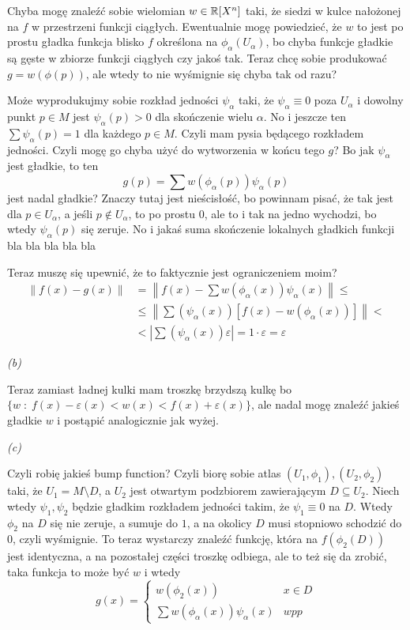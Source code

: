 \documentclass{article}
\begin{document}
Chyba mogę znaleźć sobie wielomian $w\in\mathbb{R}[X^n]$ taki, że siedzi w kulce nałożonej na $f$ w przestrzeni funkcji ciągłych. Ewentualnie mogę powiedzieć, że $w$ to jest po prostu gładka funkcja blisko $f$ określona na $\phi_\alpha(U_\alpha)$, bo chyba funkcje gładkie są gęste w zbiorze funkcji ciągłych czy jakoś tak. Teraz chcę sobie produkować $g=w(\phi(p))$, ale wtedy to nie wyśmignie się chyba tak od razu?

Może wyprodukujmy sobie rozkład jedności $\psi_\alpha$ taki, że $\psi_\alpha\equiv0$ poza $U_\alpha$ i dowolny punkt $p\in M$ jest $\psi_\alpha(p)>0$ dla skończenie wielu $\alpha$. No i jeszcze ten $\sum\psi_\alpha(p)=1$ dla każdego $p\in M$. Czyli mam pysia będącego rozkładem jedności. Czyli mogę go chyba użyć do wytworzenia w końcu tego $g$? Bo jak $\psi_\alpha$ jest gładkie, to ten
$$g(p)=\sum w(\phi_\alpha(p))\psi_\alpha(p)$$
jest nadal gładkie? Znaczy tutaj jest nieścisłość, bo powinnam pisać, że tak jest dla $p\in U_\alpha$, a jeśli $p\notin U_\alpha$, to po prostu $0$, ale to i tak na jedno wychodzi, bo wtedy $\psi_\alpha(p)$ się zeruje. No i jakaś suma skończenie lokalnych gładkich funkcji bla bla bla bla bla

Teraz muszę się upewnić, że to faktycznie jest ograniczeniem moim?
\begin{align*}
   \left\|f(x)-g(x)\right\|&=\left\|f(x)-\sum w(\phi_\alpha(x))\psi_\alpha(x)\right\|\leq\\
   &\leq\left\|\sum(\psi_\alpha(x))[f(x)-w(\phi_\alpha(x))]\right\|<\\
   &<\left|\sum(\psi_\alpha(x))\varepsilon\right|=1\cdot\varepsilon=\varepsilon
\end{align*}

\emph{(b)}

Teraz zamiast ładnej kulki mam troszkę brzydszą kulkę bo $\{w\;:\;f(x)-\varepsilon(x)<w(x)<f(x)+\varepsilon(x)\}$, ale nadal mogę znaleźć jakieś gładkie $w$ i postąpić analogicznie jak wyżej.

\emph{(c)}

Czyli robię jakieś bump function?
Czyli biorę sobie atlas $(U_1,\phi_1),(U_2,\phi_2)$ taki, że $U_1=M\setminus D$, a $U_2$ jest otwartym podzbiorem zawierającym $D\subseteq U_2$. Niech wtedy $\psi_1,\psi_2$ będzie gładkim rozkładem jedności takim, że $\psi_1\equiv 0$ na $D$. Wtedy $\phi_2$ na $D$ się nie zeruje, a sumuje do $1$, a na okolicy $D$ musi stopniowo schodzić do $0$, czyli wyśmignie. To teraz wystarczy znaleźć funkcję, która na $f(\phi_2(D))$ jest identyczna, a na pozostałej części troszkę odbiega, ale to też się da zrobić, taka funkcja to może być $w$ i wtedy
$$g(x)=\begin{cases}
    w(\phi_2(x)) & x\in D\\
    \sum w(\phi_\alpha(x))\psi_\alpha(x)&wpp
\end{cases}$$
\end{document}
